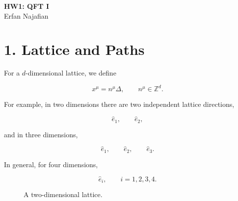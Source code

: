 \documentclass[12pt,a4paper]{article}
\begin{document}
\begin{center}
    {\Large \textbf{HW1: QFT I}}\\[4pt]
    {\large Erfan Najafian}
\end{center}

\vspace{0.5cm}


\section*{1. Lattice and Paths}

For a $d$-dimensional lattice, we define

\begin{equation}
    x^\mu = n^\mu \Delta,
    \qquad
    n^\mu \in \mathbb{Z}^d .
\end{equation}

For example, in two dimensions there are two independent lattice
directions,

\begin{equation}
    \hat e_1,\qquad \hat e_2,
\end{equation}

and in three dimensions,

\begin{equation}
    \hat e_1,\qquad
    \hat e_2,\qquad
    \hat e_3.
\end{equation}

In general, for four dimensions,

\begin{equation}
    \hat e_i,
    \qquad i=1,2,3,4.
\end{equation}


\begin{figure}[h!]
\centering


\caption{A two-dimensional lattice.}
\end{figure}
\end{document}
